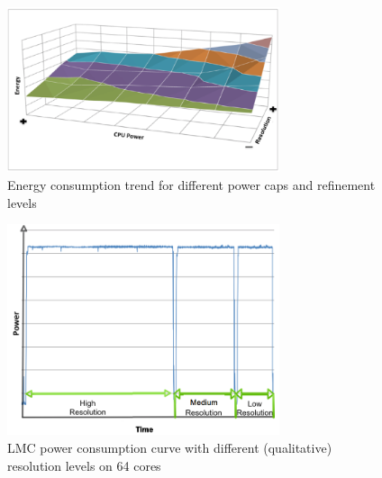 \begin{figure}[H]
	\centering
    \includegraphics[width=8cm]{figs/Energy_consumption_trend.png}
        \caption{Energy consumption trend for different power caps and refinement levels}
        \label{fig:Energy_consumption_trend}
\end{figure}

\begin{figure}[H]
	\centering
    \includegraphics[width=8cm]{figs/LMCruntime.png}
        \caption{LMC power consumption curve with different (qualitative) resolution levels on 64 cores}
        \label{fig:LMCruntime}
\end{figure}



